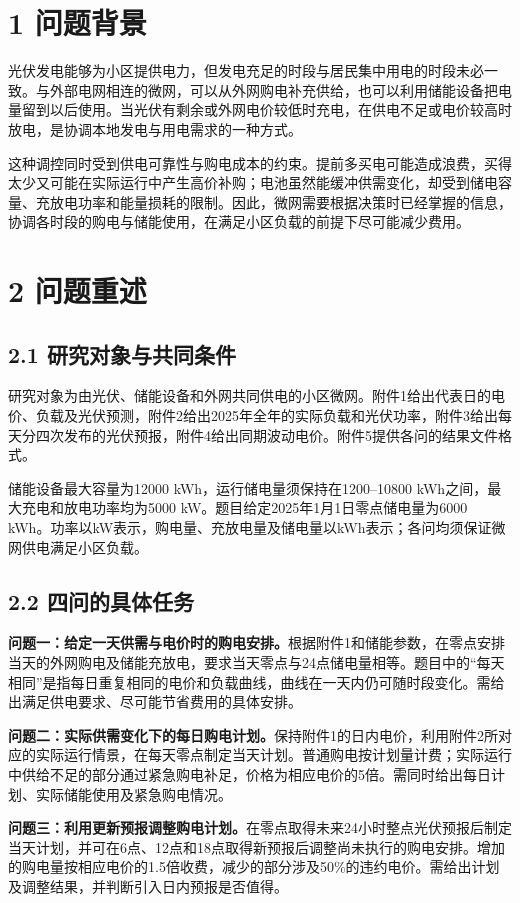 \documentclass[11pt,a4paper]{article}
\begin{document}
\section*{1 问题背景}
光伏发电能够为小区提供电力，但发电充足的时段与居民集中用电的时段未必一致。与外部电网相连的微网，可以从外网购电补充供给，也可以利用储能设备把电量留到以后使用。当光伏有剩余或外网电价较低时充电，在供电不足或电价较高时放电，是协调本地发电与用电需求的一种方式。

这种调控同时受到供电可靠性与购电成本的约束。提前多买电可能造成浪费，买得太少又可能在实际运行中产生高价补购；电池虽然能缓冲供需变化，却受到储电容量、充放电功率和能量损耗的限制。因此，微网需要根据决策时已经掌握的信息，协调各时段的购电与储能使用，在满足小区负载的前提下尽可能减少费用。

\section*{2 问题重述}
\subsection*{2.1 研究对象与共同条件}
研究对象为由光伏、储能设备和外网共同供电的小区微网。附件1给出代表日的电价、负载及光伏预测，附件2给出2025年全年的实际负载和光伏功率，附件3给出每天分四次发布的光伏预报，附件4给出同期波动电价。附件5提供各问的结果文件格式。

储能设备最大容量为12000 kWh，运行储电量须保持在1200--10800 kWh之间，最大充电和放电功率均为5000 kW。题目给定2025年1月1日零点储电量为6000 kWh。功率以kW表示，购电量、充放电量及储电量以kWh表示；各问均须保证微网供电满足小区负载。

\subsection*{2.2 四问的具体任务}
\textbf{问题一：给定一天供需与电价时的购电安排。}根据附件1和储能参数，在零点安排当天的外网购电及储能充放电，要求当天零点与24点储电量相等。题目中的“每天相同”是指每日重复相同的电价和负载曲线，曲线在一天内仍可随时段变化。需给出满足供电要求、尽可能节省费用的具体安排。

\textbf{问题二：实际供需变化下的每日购电计划。}保持附件1的日内电价，利用附件2所对应的实际运行情景，在每天零点制定当天计划。普通购电按计划量计费；实际运行中供给不足的部分通过紧急购电补足，价格为相应电价的5倍。需同时给出每日计划、实际储能使用及紧急购电情况。

\textbf{问题三：利用更新预报调整购电计划。}在零点取得未来24小时整点光伏预报后制定当天计划，并可在6点、12点和18点取得新预报后调整尚未执行的购电安排。增加的购电量按相应电价的1.5倍收费，减少的部分涉及50\%的违约电价。需给出计划及调整结果，并判断引入日内预报是否值得。
\end{document}
